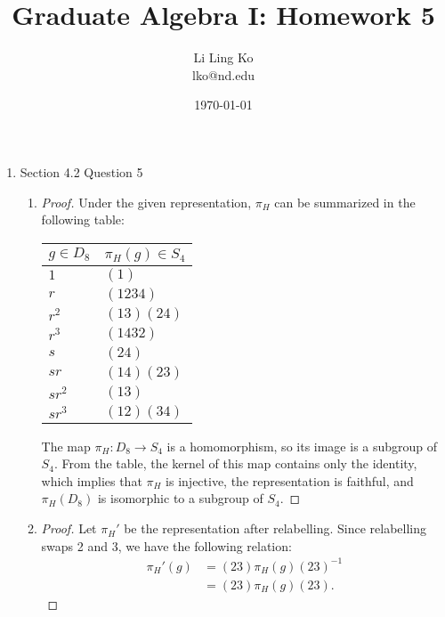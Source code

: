 \documentclass{article}
\begin{document}
\title{Graduate Algebra I: Homework 5}
\author{Li Ling Ko\\ lko@nd.edu}
\date{\today}
\maketitle

\begin{enumerate}
  \item Section 4.2 Question 5
    \begin{enumerate}
      \item
        \begin{proof}
          Under the given representation, $\pi_H$ can be summarized in the
          following table:
          \begin{center}
            \begin{tabular}{|l|l|}
              \hline
              $g\in D_8$ & $\pi_H(g)\in S_4$ \\
              \hline\hline
              $1$     & $(1)$ \\
              $r$     & $(1234)$ \\
              $r^2$   & $(13)(24)$ \\
              $r^3$   & $(1432)$ \\
              $s$     & $(24)$ \\
              $sr$    & $(14)(23)$ \\
              $sr^2$  & $(13)$ \\
              $sr^3$  & $(12)(34)$ \\
              \hline
            \end{tabular}
          \end{center}
          The map $\pi_H:D_8\rightarrow S_4$ is a homomorphism, so its
          image is a subgroup of $S_4$. From the table, the kernel of this
          map contains only the identity, which implies that $\pi_H$ is
          injective, the representation is faithful, and $\pi_H(D_8)$ is
          isomorphic to a subgroup of $S_4$.
        \end{proof}
      \item
        \begin{proof}
          Let $\pi_H'$ be the representation after relabelling. Since
          relabelling swaps 2 and 3, we have the following relation:
          \begin{align*}
            \pi_H'(g) &= (23)\pi_H(g)(23)^{-1} \\
                      &= (23)\pi_H(g)(23).

\end{align*}
\end{proof}
\end{enumerate}
\end{enumerate}
\end{document}
